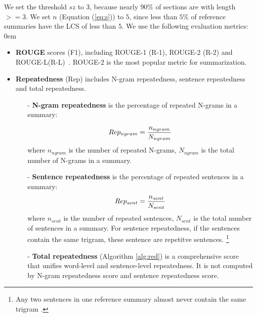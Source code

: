 We set the threshold $sz$ to $3$, 
because nearly $90\%$ 
of sections are with length$>=$3.
We set $n$ (Equation (\ref{eq:s})) to $5$,
since less than $5\%$ of reference summaries have
the LCS of less than $5$.
We use the following evaluation metrics:
\itemsep0em
\begin{itemize}

\item \textbf{ROUGE} scores (F1), including ROUGE-1 (R-1), ROUGE-2 (R-2) and
ROUGE-L(R-L)~\citep{rouge-a-package-for-automatic-evaluation-of-summaries}.
ROUGE-2 is the most popular metric for summarization.

\item \textbf{Repeatedness} (Rep) 
includes N-gram repeatedness, sentence repeatedness
and total repeatedness.
\begin{itemize}
\item[-] \textbf{N-gram repeatedness} is the percentage of repeated N-grams 
in a summary:

\begin{equation}
\small Rep_{ngram} = \frac{n_{ngram}}{N_{ngram}}
\end{equation}
where $n_{ngram}$ is the number of repeated N-grams, 
$N_{ngram}$ is the total number of N-grams in a summary.
\item[-] \textbf{Sentence repeatedness} is the percentage of repeated 
sentences in a summary:
\begin{equation}
\small Rep_{sent} = \frac{n_{sent}}{N_{sent}}
\end{equation}
where $n_{sent}$ is the number of repeated sentences, 
$N_{sent}$ is the total number of sentences in a summary.
For sentence repeatedness, if the sentences contain the same trigram,
these sentence are repetitve sentences.
\footnote{
Any two sentences in one reference summary almost never contain 
the same trigram \citep{PaulusXS17}.}
\item[-] 
\textbf{Total repeatedness} (Algorithm \ref{alg:red}) is a comprehensive score
that unifies word-level and sentence-level repeatedness.
It is not computed by N-gram repeatedness score 
and sentence repeatedness score.


\end{itemize}
\end{itemize}
